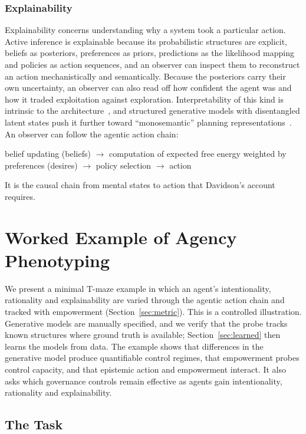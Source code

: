 \documentclass[pdflatex,sn-apa]{sn-jnl}%
\theoremstyle{definition}
\begin{document}
\subsubsection{Explainability}
Explainability concerns understanding why a system took a particular action. Active inference is explainable because its probabilistic structures are explicit, beliefs as posteriors, preferences as priors, predictions as the likelihood mapping and policies as action sequences, and an observer can inspect them to reconstruct an action mechanistically and semantically. Because the posteriors carry their own uncertainty, an observer can also read off how confident the agent was and how it traded exploitation against exploration. Interpretability of this kind is intrinsic to the architecture~\citep{albarracinVariationalApproachScripts2021}, and structured generative models with disentangled latent states push it further toward ``monosemantic'' planning representations~\citep{brickenMonosemanticity2023}. An observer can follow the agentic action chain:

\begin{center}
belief updating (beliefs) $\to$ computation of expected free energy weighted by preferences (desires) $\to$ policy selection $\to$ action
\end{center}

It is the causal chain from mental states to action that Davidson's account requires.

\section{Worked Example of Agency Phenotyping}\label{sec:worked}

We present a minimal T-maze example in which an agent's intentionality, rationality and explainability are varied through the agentic action chain and tracked with empowerment (Section~\ref{sec:metric}). This is a controlled illustration. Generative models are manually specified, and we verify that the probe tracks known structures where ground truth is available; Section~\ref{sec:learned} then learns the models from data. The example shows that differences in the generative model produce quantifiable control regimes, that empowerment probes control capacity, and that epistemic action and empowerment interact. It also asks which governance controls remain effective as agents gain intentionality, rationality and explainability.

\subsection{The Task}
\end{document}
